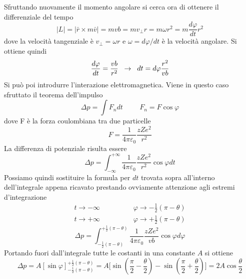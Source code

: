 Sfruttando nuovamente il momento angolare si cerca ora di ottenere il differenziale del tempo
\begin{equation}
|L|=|\bar r \times m\bar v|=mvb=mv_\perp r=m\omega r^2=m\frac{d\varphi}{dt}r^2
\end{equation}
dove la velocità tangenziale è $v_\perp=\omega r$ e $\omega=d\varphi/dt$ è la velocità angolare. 
Si ottiene quindi
\begin{equation}
\frac{d\varphi}{dt}=\frac{vb}{r^2}\hspace{0.2cm}\to\hspace{0.2cm} dt=d\varphi \frac{r^2}{vb}
\end{equation}
Si può poi introdurre l'interazione elettromagnetica. 
Viene in questo caso sfruttato il teorema dell'impulso
\begin{equation}
\Delta p=\int F_n dt\hspace{1cm}F_n=F\cos\varphi
\end{equation}
dove F è la forza coulombiana tra due particelle
\begin{equation}
F=\frac{1}{4\pi\varepsilon_0}\frac{zZe^2}{r^2}
\end{equation}
La differenza di potenziale risulta essere
\begin{equation}
\Delta p=\int_{-\infty}^{+\infty} \frac{1}{4\pi\varepsilon_0}\frac{zZe^2}{r^2}\cos\varphi dt
\end{equation}
Possiamo quindi sostituire la formula per $dt$ trovata sopra all'interno dell'integrale appena ricavato prestando ovviamente attenzione agli estremi d'integrazione 
\begin{equation}
\begin{split}
t\to -\infty\hspace{2cm}\varphi\to-\frac{1}{2}(\pi-\theta)\\
t\to +\infty\hspace{2cm}\varphi\to+\frac{1}{2}(\pi-\theta)
\end{split}
\end{equation}
\begin{equation}
\Delta p=\int _{-\frac{1}{2}(\pi-\theta)}^{+\frac{1}{2}(\pi-\theta)}\frac{1}{4\pi\varepsilon_0}\frac{zZe^2}{vb}\cos\varphi d\varphi
\end{equation}
Portando fuori dall'integrale tutte le costanti in una constante $A$ si ottiene
\begin{equation}
\Delta p=A[\sin\varphi] _{-\frac{1}{2}(\pi-\theta)}^{+\frac{1}{2}(\pi-\theta)}=A\biggl[\sin\left(\frac{\pi}{2}-\frac{\theta}{2}\right)-\sin\left(\frac{\pi}{2}+\frac{\theta}{2}\right)\biggl]=2A\cos\frac{\theta}{2}
\end{equation}
